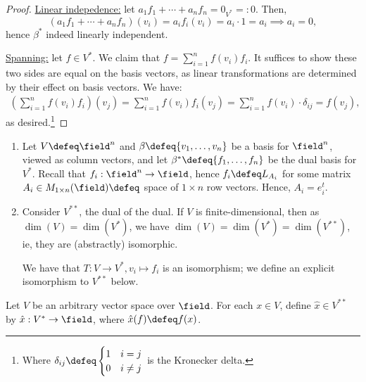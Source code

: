 \begin{proof}
    \underline{Linear indepedence:} let $a_1 f_1 + \cdots + a_n f_n = 0_{V^\ast}=: 0$. Then,
    \[
    (a_1f_1 + \cdots + a_n f_n)(v_i) = a_if_i(v_i) = a_i \cdot 1 = a_i \implies a_i = 0,    
    \]
    hence $\beta^\ast$ indeed linearly independent.

    \underline{Spanning:} let $f \in V^\ast$. We claim that $f = \sum_{i = 1}^n f(v_i) f_i$. It suffices to show these two sides are equal on the basis vectors, as linear transformations are determined by their effect on basis vectors. We have:
    \begin{align*}
       \left( \sum_{i=1}^n f(v_i) f_i\right)(v_j) = \sum_{i=1}^n f(v_i) f_i(v_j) = \sum_{i=1}^n f(v_i) \cdot \delta_{ij} = f(v_j),
    \end{align*}
    as desired.\footnote{Where $\delta_{ij} \defeq \begin{cases}
        1 & i = j\\
        0 & i \neq j
    \end{cases}$ is the Kronecker delta.}
\end{proof}

\begin{example}
    \begin{enumerate}
    \item Let $V \defeq \field^n$ and $\beta \defeq \{v_1, \dots, v_n\}$ be a basis for $\field^n$, viewed as column vectors, and let $\beta^\ast \defeq \{f_1, \dots, f_n\}$ be the dual basis for $V^\ast$. Recall that $f_i : \field^n \to \field$, hence $f_i \defeq L_{A_i}$ for some matrix $A_i \in M_{1 \times n}(\field) \defeq$ space of $1 \times n$ row vectors. Hence, $A_i = e_i^t$.
    \item Consider $V^{\ast \ast}$, the dual of the dual. If $V$ is finite-dimensional, then as $\dim(V)= \dim(V^\ast)$, we have $\dim(V) = \dim(V^\ast) = \dim(V^{\ast \ast})$, ie, they are (abstractly) isomorphic.
    
    We have that $T : V \to V^\ast, v_i \mapsto f_i$ is an isomorphism; we define an explicit isomorphism to $V^{\ast \ast}$ below.
\end{enumerate}
\end{example}

\begin{definition}
Let $V$ be an arbitrary vector space over $\field$. For each $x \in V$, define $\hat x\in V^{\ast \ast}$ by $\hat x : V^\ast \to \field$, where $\hat{x}(f) \defeq f(x)$.
\end{definition}

